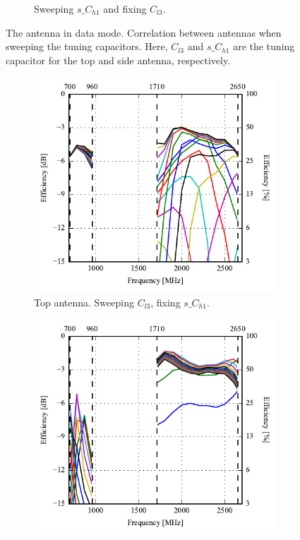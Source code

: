 \begin{figure}[htbp]
\begin{subfigure}{0.49\linewidth}
        \caption{Sweeping $s\_C_{h1}$ and fixing $C_{l3}$.}
    \end{subfigure}
    \caption{The antenna in data mode. Correlation between antennas when sweeping the tuning capacitors. Here, $C_{l3}$ and $s\_C_{h1}$ are the tuning capacitor for the top and side antenna, respectively.}
    \label{fig:corr_sol3_data}
\end{figure}

\begin{figure}[htbp]
    \centering
    \begin{subfigure}{0.49\linewidth}
        \centering
        \includegraphics{img/tech_sol/nonresonant/simulation/data_mode/EffSweepAC1/efficiency-ac1-top}
        \caption{Top antenna. Sweeping $C_{l3}$, fixing $s\_C_{h1}$.}
    \end{subfigure}
    \hfill
    \begin{subfigure}{0.49\linewidth}
        \centering
        \includegraphics{img/tech_sol/nonresonant/simulation/data_mode/EffSweepAC2/efficiency-ac2-side}

\end{subfigure}
\end{figure}
